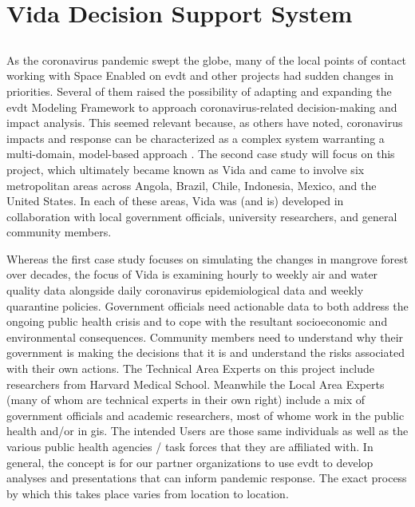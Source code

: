 \chapter{Vida Decision Support System} \label{ch:vida}



\section{}

As the coronavirus pandemic swept the globe, many of the local points of contact working with Space Enabled on \ac{evdt} and other projects had sudden changes in priorities. Several of them raised the possibility of adapting and expanding the \ac{evdt} Modeling Framework to approach coronavirus-related decision-making and impact analysis. This seemed relevant because, as others have noted, coronavirus impacts and response can be characterized as a complex system warranting a multi-domain, model-based approach \cite{deweckHandlingCOVID192020}. The second case study will focus on this project, which ultimately became known as Vida and came to involve six metropolitan areas across Angola, Brazil, Chile, Indonesia, Mexico, and the United States. In each of these areas, Vida was (and is) developed in collaboration with local government officials, university researchers, and general community members. 

Whereas the first case study focuses on simulating the changes in mangrove forest over decades, the focus of Vida is examining hourly to weekly air and water quality data alongside daily coronavirus epidemiological data and weekly quarantine policies. Government officials need actionable data to both address the ongoing public health crisis and to cope with the resultant socioeconomic and environmental consequences. Community members need to understand why their government is making the decisions that it is and understand the risks associated with their own actions. \color{OliveGreen} The Technical Area Experts on this project include researchers from Harvard Medical School. Meanwhile the Local Area Experts (many of whom are technical experts in their own right) include a mix of government officials and academic researchers, most of whome work in the public health and/or in \ac{gis}. The intended Users are those same individuals as well as the various public health agencies / task forces that they are affiliated with.  In general, \color{black} the concept is for our partner organizations to use \ac{evdt} to develop analyses and presentations that can inform pandemic response. The exact process by which this takes place varies from location to location.

